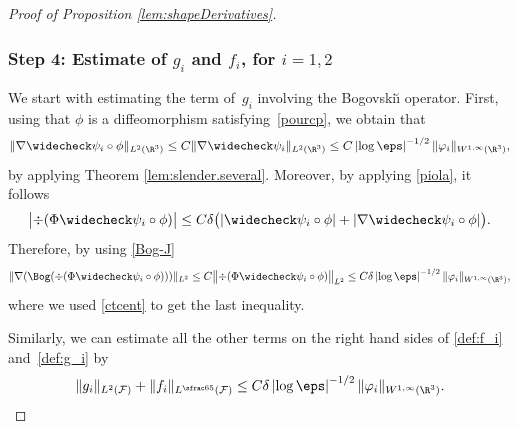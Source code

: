 \begin{proof}[Proof of Proposition \ref{lem:shapeDerivatives}]
\subsubsection*{Step 4: Estimate of $g_i$ and $f_i$, for $i=1,2$}
We start with estimating the term of~$g_i$ involving the Bogovski\u{\i} operator.
First, using that
$\phi$ is a diffeomorphism satisfying~\eqref{pourcp},
we obtain that
\begin{equation} \label{ctcent}
\|\nabla \widecheck \psi_i \circ \phi\|_{L^2(\R^3)} \leq C \|\nabla \widecheck \psi_i\|_{L^2(\R^3)} \leq C \left|\log \eps\right|^{-1/2} \|\varphi_i\|_{W^{1,\infty}(\R^3)},
\end{equation}
by applying Theorem \ref{lem:slender.several}.
Moreover, by applying \eqref{piola}, it follows
\begin{equation} \label{giro}
\bigl|\div (\Phi \widecheck \psi_i \circ \phi)\bigr|
\leq C {\delta} \bigl(|\widecheck \psi_i \circ \phi|
+ |\nabla \widecheck \psi_i \circ \phi|\bigr).
\end{equation}
Therefore, by using \eqref{Bog-J}
\begin{equation*}
\|\nabla(\Bog(\div(\Phi \widecheck \psi_i \circ \phi)))\|_{L^2} \leq C
\bigl\|\div(\Phi \widecheck \psi_i \circ \phi)\bigr\|_{L^2}
\leq C \delta \left|\log \eps\right|^{-1/2} \|\varphi_i\|_{W^{1,\infty}(\R^3)},
\end{equation*}
where we used
\eqref{ctcent} to get the last inequality.

Similarly, we can estimate all the other terms on the right hand sides of \eqref{def:f_i} and~\eqref{def:g_i} by
\begin{equation} \label{midi4}
\|g_i\|_{L^2(\mathcal F)} + \|f_i\|_{L^{\sfrac 6 5 }(\mathcal F)} \leq C \delta \left|\log \eps\right|^{-1/2} \| \varphi_i\|_{W^{1,\infty}(\R^3)}.
\end{equation}


\end{proof}
